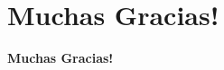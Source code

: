 \section{Muchas Gracias!}
\begin{frame}
    \Huge
    \centering
    \textbf{Muchas Gracias!}

\end{frame}



              